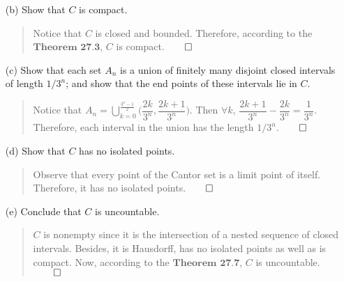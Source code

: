 \documentclass[12pt, a4paper]{article}
\begin{document}
\begin{itemize}
\begin{itemize}
\item[]

\item[(b)]
Show that $C$ is compact.
\begin{quote}
Notice that $C$ is closed and bounded. Therefore, according to the $\textbf{Theorem 27.3}$, $C$ is compact.$\qed$
\end{quote}

\item[]

\item[(c)]
Show that each set $A_n$ is a union of finitely many disjoint closed intervals of length $1/3^n$; and show that the end points of these intervals lie in $C$.
\begin{quote}
Notice that $A_n = \displaystyle\bigcup_{k = 0}^{\frac{3^n - 1}{2}}\bigg(\dfrac{2k}{3^n}, \dfrac{2k + 1}{3^n}\bigg)$.
Then $\forall k$, $\dfrac{2k + 1}{3^n} - \dfrac{2k}{3^n} = \dfrac{1}{3^n}$. Therefore, each interval in the union
has the length $1/3^n$.$\qed$
\end{quote}

\item[]
\item[]

\item[(d)]
Show that $C$ has no isolated points.
\begin{quote}
Observe that every point of the Cantor set is a limit point of itself. Therefore, it has no isolated points.$\qed$
\end{quote}

\item[]

\item[(e)]
Conclude that $C$ is uncountable.
\begin{quote}
$C$ is nonempty since it is the intersection of a nested sequence of closed intervals. Besides, it is Hausdorff, has no isolated points as well as is compact. Now, according to the $\textbf{Theorem 27.7}$, $C$ is uncountable.$\qed$
\end{quote}
\end{itemize}

\end{itemize}
\end{document}
